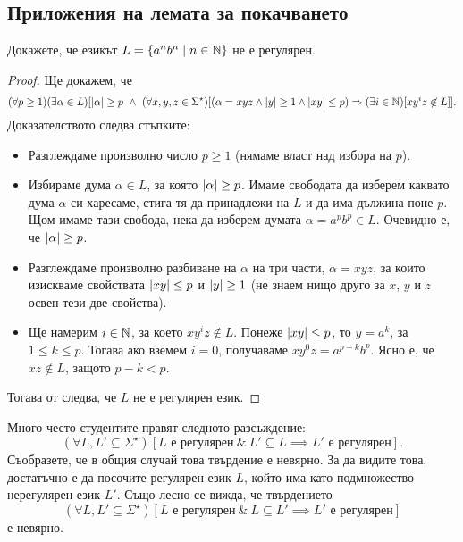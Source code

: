 \subsection*{Приложения на лемата за покачването}

\begin{problem}
  Докажете, че езикът $L = \{a^nb^n \mid n\in \mathbb{N}\}$ не е регулярен.
\end{problem}
\begin{proof}
  Ще докажем, че
  {\scriptsize
    \[(\forall p \geq 1)(\exists \alpha \in L)[\lvert{\alpha}\rvert \geq p\ \wedge\ (\forall x,y,z\in\Sigma^\star)[(\alpha = xyz \wedge \lvert{y}\rvert \geq 1\wedge \lvert{xy}\rvert \leq p) \Rightarrow (\exists i\in\mathbb{N})[xy^iz \not\in L]].\]}
  Доказателството следва стъпките:
  \begin{itemize}
  \item 
    Разглеждаме произволно число $p \geq 1$ (нямаме власт над избора на $p$).
  \item
    Избираме дума $\alpha \in L$, за която $\lvert{\alpha}\rvert \geq p$. Имаме свободата да изберем каквато дума $\alpha$
    си харесаме, стига тя да принадлежи на $L$ и да има дължина поне $p$.
    Щом имаме тази свобода, нека да изберем думата $\alpha = a^pb^p \in L$.
    Очевидно е, че $\lvert{\alpha}\rvert \geq p$.
  \item
    Разглеждаме произволно разбиване на $\alpha$ на три части, $\alpha = xyz$,
    за които изискваме свойствата $\lvert{xy}\rvert \leq p$ и $\lvert{y}\rvert \geq 1$ (не знаем нищо друго за $x$, $y$ и $z$ освен тези две свойства).
  \item
    Ще намерим $i\in\mathbb{N}$, за което $xy^iz \not\in L$.
    Понеже $\lvert{xy}\rvert \leq p$, то $y = a^k$, за  $1\leq k \leq p$.
    Тогава ако вземем $i = 0$, получаваме $xy^0z = a^{p-k}b^p$.
    Ясно е, че $xz \not\in L$, защото $p-k < p$.
  \end{itemize}  
  Тогава от  следва, че $L$ не е регулярен език.
\end{proof}

\begin{remark}
  Много често студентите правят следното разсъждение:
  \[(\forall L,L' \subseteq \Sigma^\star)[L \text{ е регулярен}\ \&\ L' \subseteq L \implies L'\text{ е регулярен}].\]
  Съобразете, че в общия случай това твърдение е невярно.
  За да видите това, достатъчно е да посочите регулярен език $L$, който има като
  подмножество нерегулярен език $L'$.
  Също лесно се вижда, че твърдението
  \[(\forall L,L' \subseteq \Sigma^\star)[L \text{ е регулярен}\ \&\ L \subseteq L' \implies L'\text{ е регулярен}]\]
  е невярно.
\end{remark}


